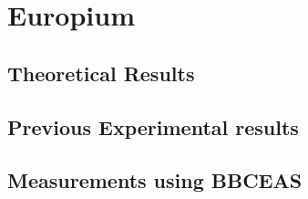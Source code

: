 \chapter{Europium}\label{chap:europium}
\section{Theoretical Results}\label{sec:theorty_eu}
\section{Previous Experimental results}\label{sec:previous_eu_results}
\section{Measurements using BBCEAS}\label{sec:europium_measurements}
